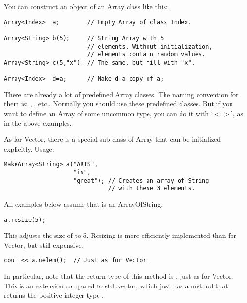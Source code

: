 You can construct an object of an Array class like this:

\begin{verbatim}
Array<Index>  a;        // Empty Array of class Index.

Array<String> b(5);     // String Array with 5
                        // elements. Without initialization, 
                        // elements contain random values.
Array<String> c(5,"x"); // The same, but fill with "x".

Array<Index>  d=a;      // Make d a copy of a;
\end{verbatim}

There are already a lot of predefined Array classes. The naming
convention for them is: , ,
etc.. Normally you should use these predefined classes. But if you want
to define an Array of some uncommon type, you can do it with `$<>$',
as in the above examples. 

As for Vector, there is a special sub-class of Array that can be
initialized explicitly. Usage:

\begin{verbatim}
MakeArray<String> a("ARTS",
                    "is",
                    "great"); // Creates an array of String
                              // with these 3 elements.
\end{verbatim}


All examples below assume that  is an ArrayOfString.

\begin{verbatim}
a.resize(5);
\end{verbatim}

This adjusts the size of  to 5. Resizing is more efficiently
implemented than for Vector, but still expensive.

\begin{verbatim}
cout << a.nelem();  // Just as for Vector.
\end{verbatim}

In particular, note that the return type of this method is
, just as for Vector. This is an extension compared to
std::vector, which just has a method  that returns the
positive integer type .

